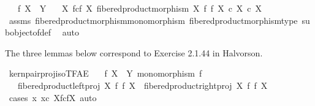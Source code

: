 \begin{isabellebody}
\ \ \ {\isachardoublequoteopen}f{\isacharcolon}{\kern0pt}\ X\ {\isasymrightarrow}\ Y{\isachardoublequoteclose}\isanewline
\ \ \ {\isachardoublequoteopen}{\isacharparenleft}{\kern0pt}X\ \isactrlbsub f\isactrlesub {\isasymtimes}\isactrlsub c\isactrlbsub f\isactrlesub \ X{\isacharcomma}{\kern0pt}\ fibered{\isacharunderscore}{\kern0pt}product{\isacharunderscore}{\kern0pt}morphism\ X\ f\ f\ X{\isacharparenright}{\kern0pt}\ {\isasymsubseteq}\isactrlsub c\ X\ {\isasymtimes}\isactrlsub c\ X{\isachardoublequoteclose}\isanewline
%
\isadelimproof
\ \ %
\endisadelimproof
%
\isatagproof
{}\isamarkupfalse%
\ assms\ fibered{\isacharunderscore}{\kern0pt}product{\isacharunderscore}{\kern0pt}morphism{\isacharunderscore}{\kern0pt}monomorphism\ fibered{\isacharunderscore}{\kern0pt}product{\isacharunderscore}{\kern0pt}morphism{\isacharunderscore}{\kern0pt}type\ subobject{\isacharunderscore}{\kern0pt}of{\isacharunderscore}{\kern0pt}def{}\ \isamarkupfalse%
\ auto%
\endisatagproof
{\isafoldproof}%
%
\isadelimproof
%
\endisadelimproof
%
\begin{isamarkuptext}%
The three lemmas below correspond to Exercise 2.1.44 in Halvorson.%
\end{isamarkuptext}\isamarkuptrue%
\isamarkupfalse%
\ kern{\isacharunderscore}{\kern0pt}pair{\isacharunderscore}{\kern0pt}proj{\isacharunderscore}{\kern0pt}iso{\isacharunderscore}{\kern0pt}TFAE{}{\isacharcolon}{\kern0pt}\isanewline
\ \ \ {\isachardoublequoteopen}f{\isacharcolon}{\kern0pt}\ X\ {\isasymrightarrow}\ Y{\isachardoublequoteclose}\ {\isachardoublequoteopen}monomorphism\ f{\isachardoublequoteclose}\isanewline
\ \ \ {\isachardoublequoteopen}{\isacharparenleft}{\kern0pt}fibered{\isacharunderscore}{\kern0pt}product{\isacharunderscore}{\kern0pt}left{\isacharunderscore}{\kern0pt}proj\ X\ f\ f\ X{\isacharparenright}{\kern0pt}\ {\isacharequal}{\kern0pt}\ {\isacharparenleft}{\kern0pt}fibered{\isacharunderscore}{\kern0pt}product{\isacharunderscore}{\kern0pt}right{\isacharunderscore}{\kern0pt}proj\ X\ f\ f\ X{\isacharparenright}{\kern0pt}{\isachardoublequoteclose}\isanewline
%
\isadelimproof
%
\endisadelimproof
%
\isatagproof
{}\isamarkupfalse%
\ {\isacharparenleft}{\kern0pt}cases\ {\isachardoublequoteopen}{\isasymexists}x{\isachardot}{\kern0pt}\ x{\isasymin}\isactrlsub c\ X\isactrlbsub f\isactrlesub {\isasymtimes}\isactrlsub c\isactrlbsub f\isactrlesub X{\isachardoublequoteclose}{\isacharcomma}{\kern0pt}\ auto{\isacharparenright}{\kern0pt}\isanewline

\end{isabellebody}
